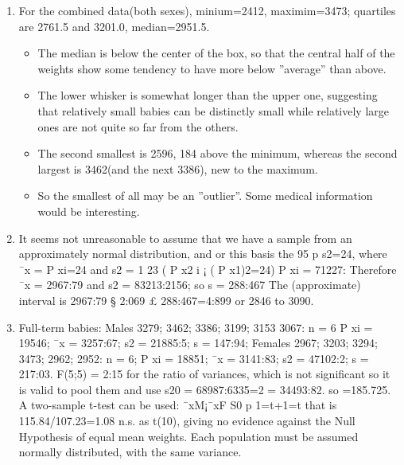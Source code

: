 \documentclass[a4paper,12pt]{article}
\begin{document}
\begin{enumerate}
    \item For the combined data(both sexes), minium=2412, maximim=3473; quartiles are 2761.5
and 3201.0, median=2951.5.
\begin{itemize}
    \item The median is below the center of the box, so that the central half of the weights show
some tendency to have more below ”average” than above.
\item The lower whisker is somewhat
longer than the upper one, suggesting that relatively small babies can be distinctly small
while relatively large ones are not quite so far from the others.
\item The second smallest is 2596, 184 above the minimum, whereas the second largest is
3462(and the next 3386), new to the maximum. 
\item So the smallest of all may be an ”outlier”.
Some medical information would be interesting.
\end{itemize}

\item  It seems not unreasonable to assume that we have a sample from an approximately
normal distribution, and or this basis the 95%
p
s2=24,
where ¯x =
P
xi=24 and s2 = 1
23 (
P
x2
i ¡ (
P
x1)2=24)
P
xi = 71227:
Therefore ¯x = 2967:79 and s2 = 83213:2156; so s = 288:467 The (approximate) interval
is 2967:79 § 2:069 £ 288:467=4:899 or 2846 to 3090.
\item Full-term babies:
Males 3279; 3462; 3386; 3199; 3153 3067: n = 6
P
xi = 19546; ¯x = 3257:67; s2 =
21885:5; s = 147:94;
Females 2967; 3203; 3294; 3473; 2962; 2952: n = 6;
P
xi = 18851; ¯x = 3141:83; s2 =
47102:2; s = 217:03.
F(5;5) = 2:15 for the ratio of variances, which is not significant so it is valid to pool them
and use s20
= 68987:6335=2 = 34493:82. so =185.725.
A two-sample t-test can be used: ¯xM¡¯xF
S0
p
1=t+1=t
that is 115.84/107.23=1.08 n.s. as t(10),
giving no evidence against the Null Hypothesis of equal mean weights. Each population
must be assumed normally distributed, with the same variance.
\end{enumerate}
\end{document}
